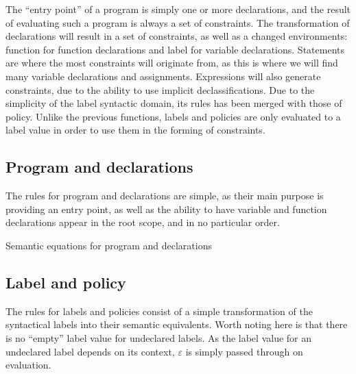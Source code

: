 The ``entry point'' of a \thelang{} program is simply one or more declarations, and the result of evaluating such a program is always a set of constraints.
The transformation of declarations will result in a set of constraints, as well as a changed environments: function for function declarations and label for variable declarations.
Statements are where the most constraints will originate from, as this is where we will find many variable declarations and assignments.
Expressions will also generate constraints, due to the ability to use implicit declassifications.
Due to the simplicity of the label syntactic domain, its rules has been merged with those of policy.
Unlike the previous functions, labels and policies are only evaluated to a label value in order to use them in the forming of constraints.

\subsection{Program and declarations}
The rules for program and declarations are simple, as their main purpose is providing an entry point, as well as the ability to have variable and function declarations appear in the root scope, and in no particular order.

\begin{table}[H]
\begin{semanticequations}
 \seSpace
 \seSpace
 \seSpace
\end{semanticequations}
\caption{Semantic equations for program and declarations}
\label{cstr:program_declarations}
\end{table}

\subsection{Label and policy}
The rules for labels and policies consist of a simple transformation of the syntactical labels into their semantic equivalents.
Worth noting here is that there is no ``empty'' label value for undeclared labels.
As the label value for an undeclared label depends on its context, $\varepsilon$ is simply passed through on evaluation.

